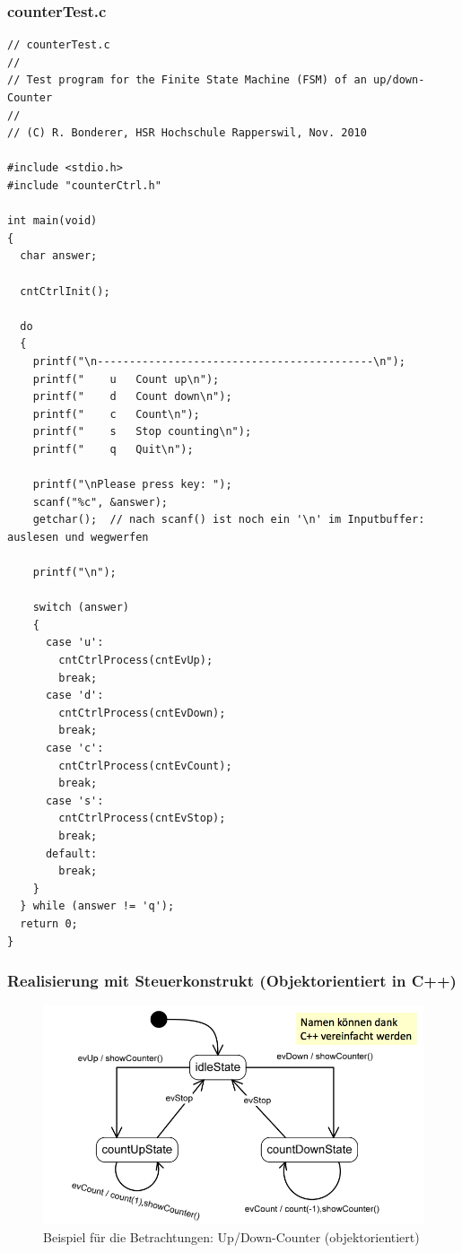\subsubsection{counterTest.c}
\label{subsec:counterTest}
\begin{lstlisting}[style=C]
// counterTest.c
//
// Test program for the Finite State Machine (FSM) of an up/down-Counter
//
// (C) R. Bonderer, HSR Hochschule Rapperswil, Nov. 2010

#include <stdio.h>
#include "counterCtrl.h"

int main(void)
{
  char answer;
  
  cntCtrlInit();
  
  do
  {
    printf("\n-------------------------------------------\n");
    printf("    u   Count up\n");
    printf("    d   Count down\n");
    printf("    c   Count\n");
    printf("    s   Stop counting\n");
    printf("    q   Quit\n");

    printf("\nPlease press key: ");
    scanf("%c", &answer);
    getchar();  // nach scanf() ist noch ein '\n' im Inputbuffer: auslesen und wegwerfen

    printf("\n");
    
    switch (answer)
    {
      case 'u':
        cntCtrlProcess(cntEvUp);
        break;
      case 'd':
        cntCtrlProcess(cntEvDown);
        break;
      case 'c':
        cntCtrlProcess(cntEvCount);
        break;
      case 's':
        cntCtrlProcess(cntEvStop);
        break;
      default:
        break;
    }
  } while (answer != 'q');
  return 0;
}
\end{lstlisting}

\subsubsection{Realisierung mit Steuerkonstrukt (Objektorientiert in
C++)}

\begin{figure}[h]
  \centering
  {\includegraphics[scale = 0.45]{images/FSM/Up_down_counter_obj}  
  \caption{Beispiel für die Betrachtungen: Up/Down-Counter (objektorientiert)}
  \label{fig:up_down_counter_obj}}
\end{figure}

